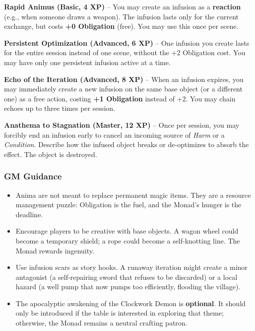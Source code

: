 \textbf{Rapid Animus (Basic, 4 XP)} -- You may create an infusion as a \textbf{reaction} (e.g., when someone draws a weapon). The infusion lasts only for the current exchange, but costs \textbf{+0 Obligation} (free). You may use this once per scene.

\textbf{Persistent Optimization (Advanced, 6 XP)} -- One infusion you create lasts for the entire session instead of one scene, without the +2 Obligation cost. You may have only one persistent infusion active at a time.

\textbf{Echo of the Iteration (Advanced, 8 XP)} -- When an infusion expires, you may immediately create a new infusion on the same base object (or a different one) as a free action, costing \textbf{+1 Obligation} instead of +2. You may chain echoes up to three times per session.

\textbf{Anathema to Stagnation (Master, 12 XP)} -- Once per session, you may forcibly end an infusion early to cancel an incoming source of \textit{Harm} or a \textit{Condition}. Describe how the infused object breaks or de-optimizes to absorb the effect. The object is destroyed.

\subsubsection*{GM Guidance}
\begin{itemize}
  \item Anima are not meant to replace permanent magic items. They are a resource management puzzle: Obligation is the fuel, and the Monad's hunger is the deadline.
  \item Encourage players to be creative with base objects. A wagon wheel could become a temporary shield; a rope could become a self-knotting line. The Monad rewards ingenuity.
  \item Use infusion scars as story hooks. A runaway iteration might create a minor antagonist (a self-repairing sword that refuses to be discarded) or a local hazard (a well pump that now pumps too efficiently, flooding the village).
  \item The apocalyptic awakening of the Clockwork Demon is \textbf{optional}. It should only be introduced if the table is interested in exploring that theme; otherwise, the Monad remains a neutral crafting patron.
\end{itemize}

